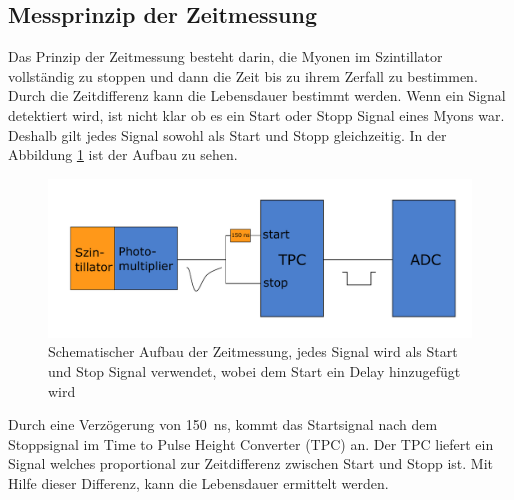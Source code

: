 \documentclass[12pt,a4paper,ngerman]{report}
\begin{document}
	\subsection{Messprinzip der Zeitmessung}
	Das Prinzip der Zeitmessung besteht darin, die Myonen im Szintillator vollständig zu stoppen und dann die Zeit bis zu ihrem Zerfall zu bestimmen. Durch die Zeitdifferenz kann die Lebensdauer bestimmt werden. Wenn ein Signal detektiert wird, ist nicht klar ob es ein Start oder Stopp Signal eines Myons war. Deshalb gilt jedes Signal sowohl als Start und Stopp gleichzeitig. In der Abbildung \ref{img:ZeitEinfach} ist der Aufbau zu sehen.
	\begin{figure}[ht]
		\centering
		\includegraphics[width=\textwidth]{Bilder/ZeitmessungEinfach.pdf}		
		\caption{Schematischer Aufbau der Zeitmessung, jedes Signal wird als Start und Stop Signal verwendet, wobei dem Start ein Delay hinzugefügt wird }
		\label{img:ZeitEinfach}
	\end{figure}
	Durch eine Verzögerung von \SI{150}{\nano \second}, kommt das Startsignal nach dem Stoppsignal im Time to Pulse Height Converter (TPC) an. Der TPC liefert ein Signal welches proportional zur Zeitdifferenz zwischen Start und Stopp ist. Mit Hilfe dieser Differenz, kann die Lebensdauer ermittelt werden.\\
\end{document}
